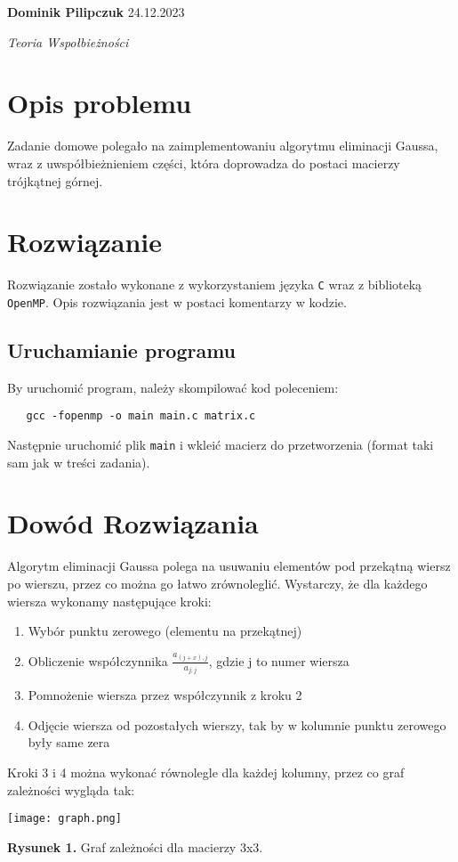 \documentclass[11pt]{article}
\begin{document}
\textbf{Dominik Pilipczuk} \hfill 24.12.2023

\textit{Teoria Wspołbieżności}
\section{Opis problemu}
Zadanie domowe polegało na zaimplementowaniu algorytmu eliminacji Gaussa,
wraz z uwspółbieżnieniem części, która doprowadza do postaci macierzy trójkątnej
górnej.
\section{Rozwiązanie}
Rozwiązanie zostało wykonane z wykorzystaniem języka \texttt{C}
wraz z biblioteką \texttt{OpenMP}. Opis rozwiązania jest w postaci komentarzy
w kodzie.
\subsection{Uruchamianie programu}
By uruchomić program, należy skompilować kod poleceniem:
\begin{verbatim}
   gcc -fopenmp -o main main.c matrix.c 
\end{verbatim}
Następnie uruchomić plik \texttt{main} i wkleić macierz do przetworzenia
(format taki sam jak w treści zadania).

\newpage
\section{Dowód Rozwiązania}
Algorytm eliminacji Gaussa polega na usuwaniu elementów pod przekątną wiersz
po wierszu, przez co można go łatwo zrównoleglić. Wystarczy, że dla każdego
wiersza wykonamy następujące kroki:
\begin{enumerate}
    \item Wybór punktu zerowego (elementu na przekątnej)
    \item Obliczenie współczynnika $\frac{a_{(j+x),j} }{a_{j,j}}$, gdzie j to numer wiersza
    \item Pomnożenie wiersza przez współczynnik z kroku 2
    \item Odjęcie wiersza od pozostałych wierszy, tak by w kolumnie punktu
        zerowego były same zera
\end{enumerate}

Kroki 3 i 4 można wykonać równolegle dla każdej kolumny, przez co graf zależności
wygląda tak:

\begin{center}
    \texttt{[image: graph.png]}

    \textbf{Rysunek 1.} Graf zależności dla macierzy $3$x$3$.
\end{center}
\end{document}
